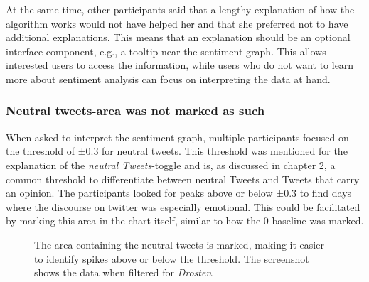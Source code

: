 At the same time, other participants said that a lengthy explanation of how the algorithm works would not have helped her and that she preferred not to have additional explanations. This means that an explanation should be an optional interface component, e.g., a tooltip near the sentiment graph. This allows interested users to access the information, while users who do not want to learn more about sentiment analysis can focus on interpreting the data at hand.

\subsubsection*{Neutral tweets-area was not marked as such}
When asked to interpret the sentiment graph, multiple participants focused on the threshold of ±0.3 for neutral tweets. This threshold was mentioned for the explanation of the \emph{neutral Tweets}-toggle and is, as discussed in chapter 2, a common threshold to differentiate between neutral Tweets and Tweets that carry an opinion. The participants looked for peaks above or below ±0.3 to find days where the discourse on twitter was especially emotional. This could be facilitated by marking this area in the chart itself, similar to how the 0-baseline was marked. 

\begin{figure}[htb]
    \centering
    \caption{The area containing the neutral tweets is marked, making it easier to identify spikes above or below the threshold. The screenshot shows the data when filtered for \emph{Drosten}.}
    \label{fig:sentiment_neutral_area}
\end{figure}

